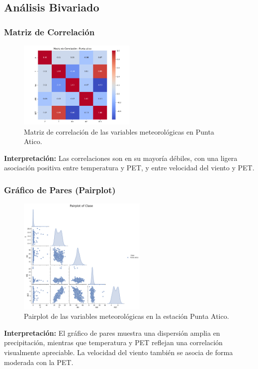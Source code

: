 \subsection{Análisis Bivariado}

\subsubsection*{Matriz de Correlación}
\begin{figure}[H]
\centering
\includegraphics[width=0.5\textwidth]{resultados/por_estacion_meteorologica/Punta_Atico/matriz_correlacion.png}
\caption{Matriz de correlación de las variables meteorológicas en Punta Atico.}
\label{fig:punta_atico_corr}
\end{figure}
\textbf{Interpretación:} Las correlaciones son en su mayoría débiles, con una ligera asociación positiva entre temperatura y PET, y entre velocidad del viento y PET.

\subsubsection*{Gráfico de Pares (Pairplot)}
\begin{figure}[H]
\centering
\includegraphics[width=0.55\textwidth]{resultados/por_estacion_meteorologica/Punta_Atico/pairplot.png}
\caption{Pairplot de las variables meteorológicas en la estación Punta Atico.}
\label{fig:punta_atico_pairplot}
\end{figure}
\textbf{Interpretación:} El gráfico de pares muestra una dispersión amplia en precipitación, mientras que temperatura y PET reflejan una correlación visualmente apreciable. La velocidad del viento también se asocia de forma moderada con la PET.




